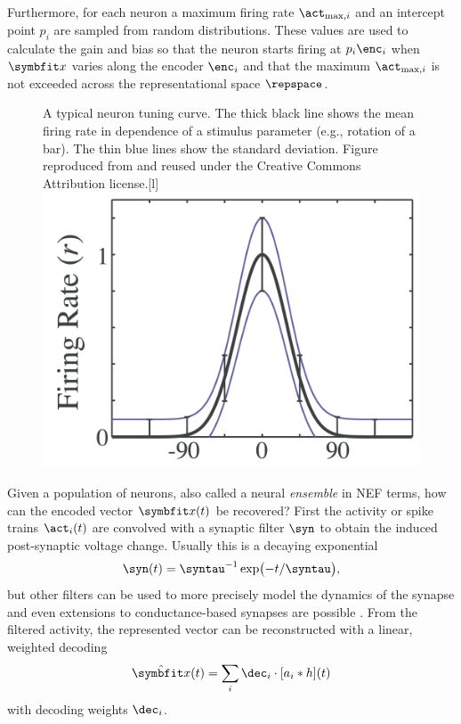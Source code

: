 Furthermore, for each neuron a maximum firing rate $\act_{\max, i}$ and an intercept point $p_i$ are sampled from random distributions.
These values are used to calculate the gain and bias so that the neuron starts firing at $p_i \enc_i$ when $\vc x$ varies along the encoder $\enc_i$ and that the maximum $\act_{\max,i}$ is not exceeded across the representational space $\repspace$.
\begin{figure}
    \begin{captionbeside}{A typical neuron tuning curve. The thick black line shows the mean firing rate in dependence of a stimulus parameter (e.g., rotation of a bar). The thin blue lines show the standard deviation. Figure reproduced from \textcite{butts2006} and reused under the Creative Commons Attribution license.\label{fig:tuningcurve}}[l]
        \includegraphics[scale=1.3]{figures/tuningcurve}
    \end{captionbeside}
\end{figure}

Given a population of neurons, also called a neural \emph{ensemble} in NEF terms, how can the encoded vector $\vc x(t)$ be recovered?
First the activity or spike trains $\act_i(t)$ are convolved with a synaptic filter $\syn$ to obtain the induced post-synaptic voltage change.
Usually this is a decaying exponential
\begin{equation}
    \syn(t) = \syntau^{-1}\exp\!\big({-t} / \syntau\big) \text{,}
\end{equation}
but other filters can be used to more precisely model the dynamics of the synapse \parencite{voelker2017a} and even extensions to conductance-based synapses are possible \parencite{stockel2017}.
From the filtered activity, the represented vector can be reconstructed with a linear, weighted decoding
\begin{equation}
    \hat{\vc x}(t) = \sum_i \dec_i \cdot \sbr{a_i * h}\!(t)
\end{equation}
with decoding weights $\dec_i$.

